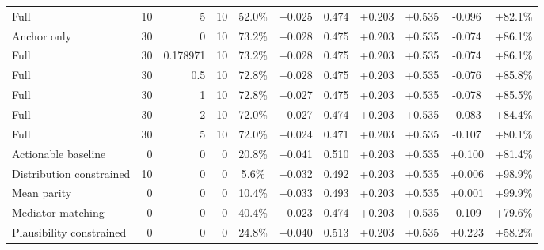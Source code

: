 \begin{table}[htbp]
\begin{tabular}{lrrrccccccc}
Full & 10 & 5 & 10 & 52.0\% & +0.025 & 0.474 & +0.203 & +0.535 & -0.096 & +82.1\% \\
Anchor only & 30 & 0 & 10 & 73.2\% & +0.028 & 0.475 & +0.203 & +0.535 & -0.074 & +86.1\% \\
Full & 30 & 0.178971 & 10 & 73.2\% & +0.028 & 0.475 & +0.203 & +0.535 & -0.074 & +86.1\% \\
Full & 30 & 0.5 & 10 & 72.8\% & +0.028 & 0.475 & +0.203 & +0.535 & -0.076 & +85.8\% \\
Full & 30 & 1 & 10 & 72.8\% & +0.027 & 0.475 & +0.203 & +0.535 & -0.078 & +85.5\% \\
Full & 30 & 2 & 10 & 72.0\% & +0.027 & 0.474 & +0.203 & +0.535 & -0.083 & +84.4\% \\
Full & 30 & 5 & 10 & 72.0\% & +0.024 & 0.471 & +0.203 & +0.535 & -0.107 & +80.1\% \\
Actionable baseline & 0 & 0 & 0 & 20.8\% & +0.041 & 0.510 & +0.203 & +0.535 & +0.100 & +81.4\% \\
Distribution constrained & 10 & 0 & 0 & 5.6\% & +0.032 & 0.492 & +0.203 & +0.535 & +0.006 & +98.9\% \\
Mean parity & 0 & 0 & 0 & 10.4\% & +0.033 & 0.493 & +0.203 & +0.535 & +0.001 & +99.9\% \\
Mediator matching & 0 & 0 & 0 & 40.4\% & +0.023 & 0.474 & +0.203 & +0.535 & -0.109 & +79.6\% \\
Plausibility constrained & 0 & 0 & 0 & 24.8\% & +0.040 & 0.513 & +0.203 & +0.535 & +0.223 & +58.2\% \\
\bottomrule
\end{tabular}
\end{table}
